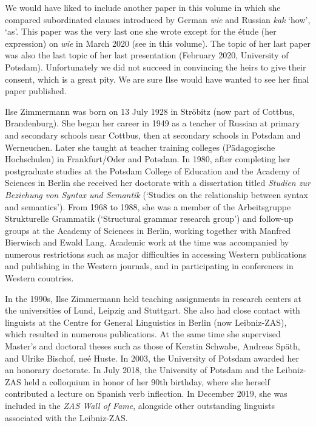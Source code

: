 \documentclass[output=paper,colorlinks,citecolor=brown]{langscibook}
\begin{document}
We would have liked to include another paper in this volume in which she compared subordinated clauses introduced by German \textit{wie} and Russian \textit{kak} ‘how’, ‘as’. This paper was the very last one she wrote except for the étude (her expression) on \textit{wie} in March 2020 (see \cite{Zimmermann2020} in this volume). The topic of her last paper was also the last topic of her last presentation (February 2020, University of Potsdam). Unfortunately we did not succeed in convincing the heirs to give their consent, which is a great pity. We are sure Ilse would have wanted to see her final paper published.

\largerpage
Ilse Zimmermann was born on 13 July 1928 in Ströbitz (now part of Cottbus, Brandenburg). She began her career in 1949 as a teacher of Russian at primary and secondary schools near Cottbus, then at secondary schools in Potsdam and Werneuchen. Later she taught at teacher training colleges (Pädagogische Hoch\-schu\-len) in Frankfurt/Oder and Potsdam. In 1980, after completing her postgraduate studies at the Potsdam College of Education and the Academy of Sciences in Berlin she received her doctorate with a dissertation titled \textit{Studien zur Beziehung von Syntax und Semantik} (‘Studies on the relationship between syntax and semantics’). From 1968 to 1988, she was a member of the Arbeitsgruppe Strukturelle Grammatik (‘Structural grammar research group’) and follow-up groups at the Academy of Sciences in Berlin, working together with Manfred Bierwisch and Ewald Lang. Academic work at the time was accompanied by numerous restrictions such as major difficulties in  accessing Western publications and publishing in the Western journals, and in participating in conferences in Western countries.

In the 1990s, Ilse Zimmermann held teaching assignments in  research centers at the universities of Lund, Leipzig and Stuttgart. She also had close contact with linguists at the Centre for General Linguistics in Berlin (now Leibniz-ZAS), which resulted in numerous publications. At the same time she supervised Master's and doctoral theses such as those of Kerstin Schwabe, Andreas Späth, and Ulrike Bischof, neé Huste. In 2003, the University of Potsdam awarded her an honorary doctorate. In July 2018, the University of Potsdam and the Leibniz-ZAS held a colloquium in honor of her 90th birthday, where she herself contributed a lecture on Spanish verb inflection. In December 2019, she was included in the \textit{ZAS Wall of Fame}, alongside other outstanding linguists associated with the Leibniz-ZAS.
\end{document}
